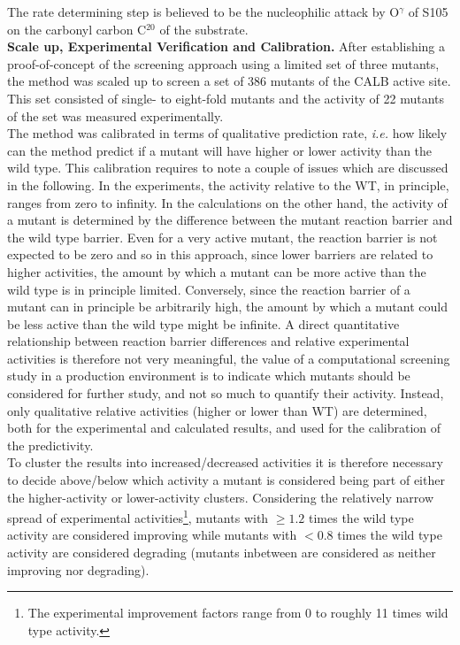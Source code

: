 The rate determining step is believed to be the nucleophilic attack by O$^\gamma$ of S105 on the carbonyl carbon C$^{20}$ of the substrate.\\
\textbf{Scale up, Experimental Verification and Calibration.}
After establishing a proof-of-concept of the screening approach using a limited set of three mutants\cite{10.1371/journal.pone.0049849}, the method was scaled up to screen a set of 386 mutants of the CALB active site\cite{hediger2013silico}.
This set consisted of single- to eight-fold mutants and the activity of 22 mutants of the set was measured experimentally.\\
The method was calibrated in terms of qualitative prediction rate, \textit{i.e.} how likely can the method predict if a mutant will have higher or lower activity than the wild type.
This calibration requires to note a couple of issues which are discussed in the following.
In the experiments, the activity relative to the WT, in principle, ranges from zero to infinity.
In the calculations on the other hand, the activity of a mutant is determined by the difference between the mutant reaction barrier and the wild type barrier.
Even for a very active mutant, the reaction barrier is not expected to be zero and so in this approach, since lower barriers are related to higher activities, the amount by which a mutant can be more active than the wild type is in principle limited.
Conversely, since the reaction barrier of a mutant can in principle be arbitrarily high, the amount by which a mutant could be less active than the wild type might be infinite.
A direct quantitative relationship between reaction barrier differences and relative experimental activities is therefore not very meaningful, the value of a computational screening study in a production environment is to indicate which mutants should be considered for further study, and not so much to quantify their activity.
Instead, only qualitative relative activities (higher or lower than WT) are determined, both for the experimental and calculated results, and used for the calibration of the predictivity.\\
To cluster the results into increased/decreased activities it is therefore necessary to decide above/below which activity a mutant is considered being part of either the higher-activity or lower-activity clusters.
Considering the relatively narrow spread of experimental activities\footnote{The experimental improvement factors range from 0 to roughly 11 times wild type activity.}, mutants with $\geq1.2$ times the wild type activity are considered improving while mutants with $<0.8$ times the wild type activity are considered degrading (mutants inbetween are considered as neither improving nor degrading)\cite{hediger2013silico}.
